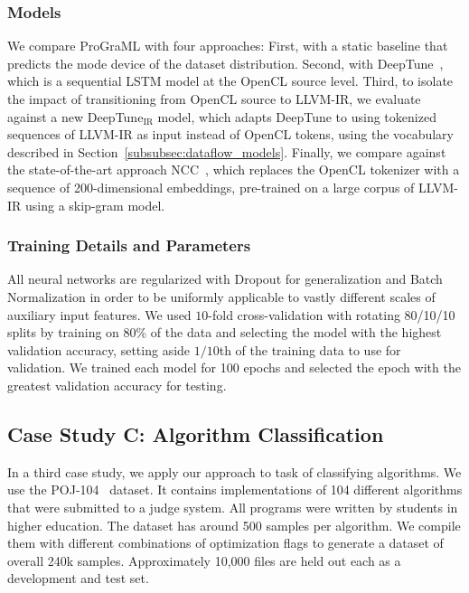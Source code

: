\subsubsection{Models}%
\label{subsubsection:devmap_models}

We compare ProGraML with four approaches: First, with a static
baseline that predicts the mode device of the dataset
distribution. Second, with DeepTune~\cite{Cummins2017b}, which is a
sequential LSTM model at the OpenCL source level. Third, to isolate
the impact of transitioning from OpenCL source to LLVM-IR, we evaluate
against a new DeepTune$_{\text{IR}}$ model, which adapts DeepTune to
using tokenized sequences of LLVM-IR as input instead of OpenCL
tokens, using the vocabulary described in
Section~\ref{subsubsec:dataflow_models}. Finally, we compare against
the state-of-the-art approach NCC~\cite{Ben-nun2018}, which replaces
the OpenCL tokenizer with a sequence of 200-dimensional embeddings,
pre-trained on a large corpus of LLVM-IR using a skip-gram model.


\subsubsection{Training Details and Parameters}

All neural networks are regularized with Dropout \cite{Hinton2012} for
generalization and Batch Normalization \cite{Ioffe2015a} in order to
be uniformly applicable to vastly different scales of auxiliary input
features. We used $10$-fold cross-validation with rotating 80/10/10
splits by training on 80\% of the data and selecting the model with
the highest validation accuracy, setting aside $1/10$th of the
training data to use for validation. We trained each model for 100
epochs and selected the epoch with the greatest validation accuracy
for testing.


\subsection{Case Study C: Algorithm Classification}

In a third case study, we apply our approach to task of classifying
algorithms. We use the POJ-104~\cite{Mou2016} dataset.  It contains
implementations of 104 different algorithms that were submitted to a
judge system. All programs were written by students in higher
education. The dataset has around 500 samples per algorithm. We
compile them with different combinations of optimization flags to
generate a dataset of overall 240k samples. Approximately 10,000 files
are held out each as a development and test set.


